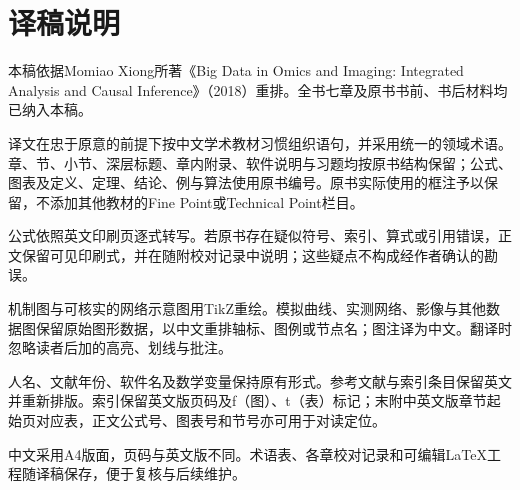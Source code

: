 
\chapter*{译稿说明}
本稿依据Momiao Xiong所著《Big Data in Omics and Imaging: Integrated Analysis and Causal Inference》（2018）重排。全书七章及原书书前、书后材料均已纳入本稿。

译文在忠于原意的前提下按中文学术教材习惯组织语句，并采用统一的领域术语。章、节、小节、深层标题、章内附录、软件说明与习题均按原书结构保留；公式、图表及定义、定理、结论、例与算法使用原书编号。原书实际使用的框注予以保留，不添加其他教材的Fine Point或Technical Point栏目。

公式依照英文印刷页逐式转写。若原书存在疑似符号、索引、算式或引用错误，正文保留可见印刷式，并在随附校对记录中说明；这些疑点不构成经作者确认的勘误。

机制图与可核实的网络示意图用TikZ重绘。模拟曲线、实测网络、影像与其他数据图保留原始图形数据，以中文重排轴标、图例或节点名；图注译为中文。翻译时忽略读者后加的高亮、划线与批注。

人名、文献年份、软件名及数学变量保持原有形式。参考文献与索引条目保留英文并重新排版。索引保留英文版页码及f（图）、t（表）标记；末附中英文版章节起始页对应表，正文公式号、图表号和节号亦可用于对读定位。

中文采用A4版面，页码与英文版不同。术语表、各章校对记录和可编辑LaTeX工程随译稿保存，便于复核与后续维护。
